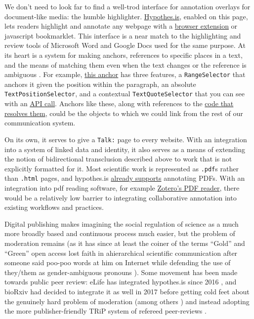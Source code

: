 We don't need to look far to find a well-trod interface for annotation
overlays for document-like media: the humble highlighter.
\href{https://hypothes.is}{Hypothes.is}, enabled on this page, lets
readers highlight and annotate any webpage with a
\href{https://chrome.google.com/webstore/detail/hypothesis-web-pdf-annota/bjfhmglciegochdpefhhlphglcehbmek}{browser
extension} or javascript bookmarklet. This interface is a near match to
the highlighting and review tools of Microsoft Word and Google Docs used
for the same purpose. At its heart is a system for making anchors,
references to specific places in a text, and the means of matching them
even when the text changes or the reference is ambiguous \citep{csillagFuzzyAnchoring2013} . For example,
\href{https://hypothes.is/a/oLw4uk7_Eeyt5N-FVlE3fw}{this anchor} has
three features, a \texttt{RangeSelector} that anchors it given the
position within the paragraph, an absolute
\texttt{TextPositionSelector}, and a contextual
\texttt{TextQuoteSelector} that you can see with an
\href{https://api.hypothes.is/api/annotations/oLw4uk7_Eeyt5N-FVlE3fw}{API
call}. Anchors like these, along with references to the
\href{https://github.com/hypothesis/client/blob/fb08cdf38191643d7a35d84ca3b822589c2e880a/src/annotator/anchoring/types.js}{code
that resolves them}, could be the objects to which we could link from
the rest of our communication system.

On its own, it serves to give a \texttt{Talk:} page to every website.
With an integration into a system of linked data and identity, it also
serves as a means of extending the notion of bidirectional transclusion
described above to work that is not explicitly formatted for it. Most
scientific work is represented as \texttt{.pdf}s rather than
\texttt{.html} pages, and hypothes.is
\href{https://web.hypothes.is/help/annotating-locally-saved-pdfs/}{already
supports} annotating PDFs. With an integration into pdf reading
software, for example
\href{https://www.zotero.org/support/pdf_reader_preview}{Zotero's PDF
reader}, there would be a relatively low barrier to integrating
collaborative annotation into existing workflows and practices.

Digital publishing makes imagining the social regulation of science as a
much more broadly based and continuous process much easier, but the
problem of moderation remains (as it has since at least the coiner of
the terms ``Gold'' and ``Green'' open access lost faith in ahierarchical
scientific communication after someone said poo-poo words at him on
Internet while defending the use of they/them as gender-ambiguous
pronouns \citep{harnadSkyWriting1987, harnadScholarlySkywritingPrepublication1990, ellisBooksTranslationWanted1986} ). Some movement has been made
towards public peer review: eLife has integrated hypothes.is since 2016
\citep{ELifePartnersHypothes2016} , and bioRxiv had decided to
integrate it as well in 2017 \citep{dwhlyBioRxivSelectsHypothesis2017}  before getting cold feet about the genuinely hard problem of
moderation (among others \citep{heatherstainesPreprintServicesGather2018} ) and instead adopting the
more publisher-friendly TRiP system of refereed peer-reviews \citep{nateangellAnnouncingTRiPTransparent2019} .


